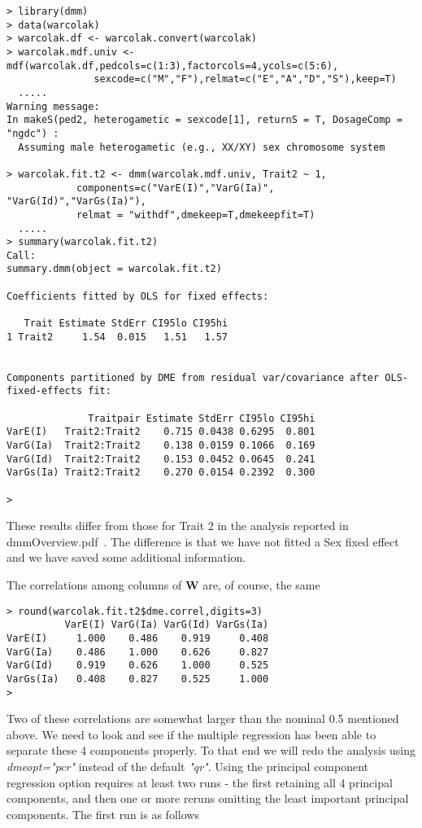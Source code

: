 \documentclass[titlepage,a4paper,12pt]{article}  %
\begin{document}
\begin{verbatim}
> library(dmm)
> data(warcolak)
> warcolak.df <- warcolak.convert(warcolak)
> warcolak.mdf.univ <- mdf(warcolak.df,pedcols=c(1:3),factorcols=4,ycols=c(5:6),
               sexcode=c("M","F"),relmat=c("E","A","D","S"),keep=T)
  .....
Warning message:
In makeS(ped2, heterogametic = sexcode[1], returnS = T, DosageComp = "ngdc") :
  Assuming male heterogametic (e.g., XX/XY) sex chromosome system

> warcolak.fit.t2 <- dmm(warcolak.mdf.univ, Trait2 ~ 1,
            components=c("VarE(I)","VarG(Ia)", "VarG(Id)","VarGs(Ia)"),
            relmat = "withdf",dmekeep=T,dmekeepfit=T)
  .....
> summary(warcolak.fit.t2)
Call:
summary.dmm(object = warcolak.fit.t2)

Coefficients fitted by OLS for fixed effects:

   Trait Estimate StdErr CI95lo CI95hi
1 Trait2     1.54  0.015   1.51   1.57


Components partitioned by DME from residual var/covariance after OLS-fixed-effects fit:

              Traitpair Estimate StdErr CI95lo CI95hi
VarE(I)   Trait2:Trait2    0.715 0.0438 0.6295  0.801
VarG(Ia)  Trait2:Trait2    0.138 0.0159 0.1066  0.169
VarG(Id)  Trait2:Trait2    0.153 0.0452 0.0645  0.241
VarGs(Ia) Trait2:Trait2    0.270 0.0154 0.2392  0.300

> 
\end{verbatim}

These results differ from those for Trait 2 in the analysis reported in dmmOverview.pdf~\cite{jack:15}. The difference is that we have not fitted a Sex fixed effect and we have saved some additional information. 

The correlations among columns of $\bm{W}$ are, of course, the same

\begin{verbatim}
> round(warcolak.fit.t2$dme.correl,digits=3)
          VarE(I) VarG(Ia) VarG(Id) VarGs(Ia)
VarE(I)     1.000    0.486    0.919     0.408
VarG(Ia)    0.486    1.000    0.626     0.827
VarG(Id)    0.919    0.626    1.000     0.525
VarGs(Ia)   0.408    0.827    0.525     1.000
> 
\end{verbatim}

Two of these correlations are somewhat larger than the nominal 0.5 mentioned above. We need to look and see if the multiple regression has been able to separate these 4 components properly. To that end we will redo the analysis using {\em dmeopt="pcr"} instead of the default {\em "qr"}. Using the principal component regression option requires at least two runs - the first retaining all 4 principal components, and then one or more reruns omitting the least important principal components. The first run is as follows
\end{document}

